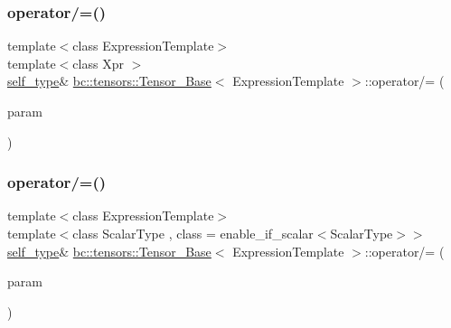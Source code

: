 \mbox{\label{classbc_1_1tensors_1_1Tensor__Base_ad5855e66ed49a73164d6c88014e3dfa1}} 
\subsubsection{\texorpdfstring{operator/=()}{operator/=()}\hspace{0.1cm}{\footnotesize\ttfamily [1/2]}}
{\footnotesize\ttfamily template$<$class Expression\+Template$>$ \\
template$<$class Xpr $>$ \\
\hyperlink{classbc_1_1tensors_1_1Expression__Base}{self\+\_\+type}\& \hyperlink{classbc_1_1tensors_1_1Tensor__Base}{bc\+::tensors\+::\+Tensor\+\_\+\+Base}$<$ Expression\+Template $>$\+::operator/= (\begin{DoxyParamCaption}\item[{const \hyperlink{classbc_1_1tensors_1_1Expression__Base}{Expression\+\_\+\+Base}$<$ Xpr $>$ \&}]{param }\end{DoxyParamCaption})\hspace{0.3cm}{\ttfamily [inline]}}

\mbox{\label{classbc_1_1tensors_1_1Tensor__Base_ad80c7c925edbc5496de75d8ae6ad4d4f}} 
\subsubsection{\texorpdfstring{operator/=()}{operator/=()}\hspace{0.1cm}{\footnotesize\ttfamily [2/2]}}
{\footnotesize\ttfamily template$<$class Expression\+Template$>$ \\
template$<$class Scalar\+Type , class  = enable\+\_\+if\+\_\+scalar$<$\+Scalar\+Type$>$$>$ \\
\hyperlink{classbc_1_1tensors_1_1Expression__Base}{self\+\_\+type}\& \hyperlink{classbc_1_1tensors_1_1Tensor__Base}{bc\+::tensors\+::\+Tensor\+\_\+\+Base}$<$ Expression\+Template $>$\+::operator/= (\begin{DoxyParamCaption}\item[{const Scalar\+Type \&}]{param }\end{DoxyParamCaption})\hspace{0.3cm}{\ttfamily [inline]}}

